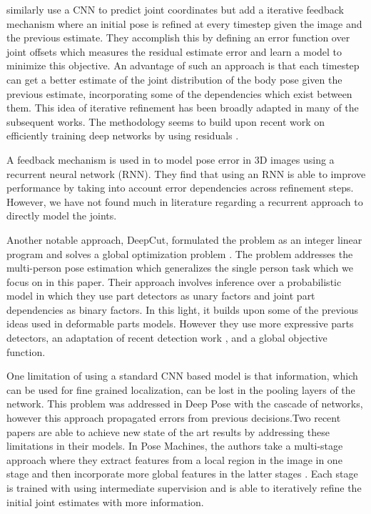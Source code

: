 \documentclass[11pt,twocolumn,letterpaper]{article}
\begin{document}
\cite{carreira2015human} similarly use a CNN to predict joint coordinates but add a iterative feedback mechanism where an initial pose is refined at every timestep given the image and the previous estimate. They accomplish this by defining an error function over joint offsets which measures the residual estimate error and learn a model to minimize this objective. An advantage of such an approach is that each timestep can get a better estimate of the joint distribution of the body pose given the previous estimate, incorporating some of the dependencies which exist between them. This idea of iterative refinement has been broadly adapted in many of the subsequent works. The methodology seems to build upon recent work on efficiently training deep networks by using residuals \cite{he2015deep}.

A feedback mechanism is used in \cite{haque2016viewpoint} to model pose error in 3D images using a recurrent neural network (RNN). They find that using an RNN is able to improve performance by taking into account error dependencies across refinement steps. However, we have not found much in literature regarding a recurrent approach to directly model the joints.

Another notable approach, DeepCut, formulated the problem as an integer linear program and solves a global optimization problem \cite{pishchulin2015deepcut}. The problem addresses the multi-person pose estimation which generalizes the single person task which we focus on in this paper. Their approach involves inference over a probabilistic model in which they use part detectors as unary factors and joint part dependencies as binary factors. In this light, it builds upon some of the previous ideas used in deformable parts models. However they use more expressive parts detectors, an adaptation of recent detection work \cite{ren2015faster}, and a global objective function.

One limitation of using a standard CNN based model is that information, which can be used for fine grained localization, can be lost in the pooling layers of the network. This problem was addressed in Deep Pose with the cascade of networks, however this approach propagated errors from previous decisions.Two recent papers are able to achieve new state of the art results by addressing these limitations in their models. In Pose Machines, the authors take a multi-stage approach where they extract features from a local region in the image in one stage and then incorporate more global features in the latter stages \cite{wei2016convolutional}. Each stage is trained with using intermediate supervision and is able to iteratively refine the initial joint estimates with more information.
\end{document}
